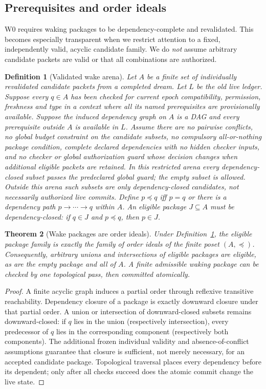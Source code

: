 \documentclass[11pt,letterpaper]{article}
\newtheorem{theorem}{Theorem}[section]
\newtheorem{definition}[theorem]{Definition}
\begin{document}
\subsection{Prerequisites and order ideals}
W0 requires waking packages to be dependency-complete and revalidated. This becomes especially transparent when we restrict attention to a fixed, independently valid, acyclic candidate family. We do \emph{not} assume arbitrary candidate packets are valid or that all combinations are authorized.
\begin{definition}[Validated wake arena]\label{def:wakearena}
Let $A$ be a finite set of individually revalidated candidate packets from a completed dream. Let $L$ be the old live ledger. Suppose every $q\in A$ has been checked for current epoch compatibility, permission, freshness and type in a context where all its named prerequisites are provisionally available. Suppose the induced dependency graph on $A$ is a DAG and every prerequisite outside $A$ is available in $L$. Assume there are no pairwise conflicts, no global budget constraint on the candidate subsets, no compulsory all-or-nothing package condition, complete declared dependencies with no hidden checker inputs, and no checker or global authorization guard whose decision changes when \emph{additional} eligible packets are retained. In this \emph{restricted arena} every dependency-closed subset passes the predeclared global guard; the empty subset is allowed. Outside this arena such subsets are only dependency-closed candidates, not necessarily authorized live commits. Define $p\preceq q$ iff $p=q$ or there is a dependency path $p\to\cdots\to q$ within $A$. An \emph{eligible package} $J\subseteq A$ must be dependency-closed: if $q\in J$ and $p\preceq q$, then $p\in J$.
\end{definition}
\begin{theorem}[Wake packages are order ideals]\label{thm:ideals}
Under Definition~\ref{def:wakearena}, the eligible package family is exactly the family of order ideals of the finite poset $(A,\preceq)$. Consequently, arbitrary unions and intersections of eligible packages are eligible, as are the empty package and all of $A$. A finite admissible waking package can be checked by one topological pass, then committed atomically.
\end{theorem}
\begin{proof}
A finite acyclic graph induces a partial order through reflexive transitive reachability. Dependency closure of a package is exactly downward closure under that partial order. A union or intersection of downward-closed subsets remains downward-closed: if $q$ lies in the union (respectively intersection), every predecessor of $q$ lies in the corresponding component (respectively both components). The additional frozen individual validity and absence-of-conflict assumptions guarantee that closure is sufficient, not merely necessary, for an accepted candidate package. Topological traversal places every dependency before its dependent; only after all checks succeed does the atomic commit change the live state.
\end{proof}
\end{document}
